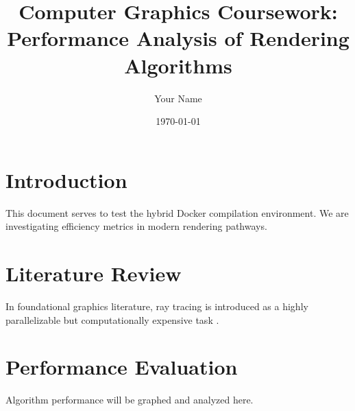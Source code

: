 \documentclass[12pt]{article}
\title{Computer Graphics Coursework:\\ Performance Analysis of Rendering Algorithms}
\author{Your Name}
\date{\today}
\begin{document}
\maketitle

\section{Introduction}
This document serves to test the hybrid Docker compilation environment. 
We are investigating efficiency metrics in modern rendering pathways.

\section{Literature Review}
In foundational graphics literature, ray tracing is introduced as a highly parallelizable but computationally expensive task \cite{shirley2020raytracing}.

\section{Performance Evaluation}
Algorithm performance will be graphed and analyzed here.

\printbibliography
\end{document}
